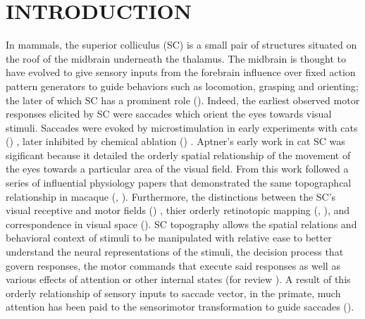 \documentclass{ar-1col}
\begin{document}
\section{INTRODUCTION}
In mammals, the superior colliculus (SC) is a small pair of structures situated on the roof of the midbrain underneath the thalamus. The midbrain is thought to have evolved to give sensory  inputs from the forebrain influence over fixed action pattern generators to guide behaviors such as locomotion, grasping and orienting; the later of which SC has a prominent role (\cite{schneider2014brain}). Indeed, the earliest observed motor responses elicited by SC were saccades which orient the eyes towards visual stimuli. Saccades were evoked by microstimulation in early experiments with cats (\cite{adamuk1870dieinnervation}) , later inhibited by chemical ablation (\cite{apter1946eye}) . Aptner's early work in cat SC was sigificant because it detailed the orderly spatial relationship of the movement of the eyes towards a particular area of the visual field. From this work followed a series of influential physiology papers that demonstrated the same topographcal relationship in macaque (\cite{robinson1972eye}, \cite{schiller1972single}). Furthermore, the distinctions between the SC’s visual receptive and motor fields (\cite{goldberg1972activity}) , thier orderly retinotopic mapping (\cite{wurtz1971superior}, \cite{robinson1972eye}), and correspondence in visual space (\cite{schiller1972single}). SC topography allows the spatial relations and behavioral context of stimuli to be manipulated with relative ease to better understand the neural representations of the stimuli, the decision process that govern responses, the motor commands that execute said responses as well as various effects of attention or other internal states (for review \cite{basso2017circuits}). A result of this orderly relationship of sensory inputs to saccade vector, in the primate, much attention has been paid to the sensorimotor transformation to guide saccades (\cite{wurtz1980visual}).  
\end{document}
